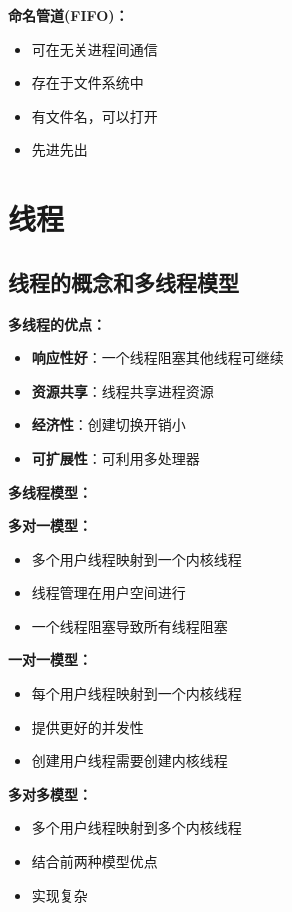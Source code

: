 \documentclass[lang=cn,newtx,10pt,scheme=chinese]{../../elegantbook}
\begin{document}
\textbf{命名管道(FIFO)：}
\begin{itemize}
  \item 可在无关进程间通信
  \item 存在于文件系统中
  \item 有文件名，可以打开
  \item 先进先出
\end{itemize}

\section{线程}

\subsection{线程的概念和多线程模型}

\textbf{多线程的优点：}
\begin{itemize}
  \item \textbf{响应性好}：一个线程阻塞其他线程可继续
  \item \textbf{资源共享}：线程共享进程资源
  \item \textbf{经济性}：创建切换开销小
  \item \textbf{可扩展性}：可利用多处理器
\end{itemize}

\textbf{多线程模型：}

\textbf{多对一模型：}
\begin{itemize}
  \item 多个用户线程映射到一个内核线程
  \item 线程管理在用户空间进行
  \item 一个线程阻塞导致所有线程阻塞
\end{itemize}

\textbf{一对一模型：}
\begin{itemize}
  \item 每个用户线程映射到一个内核线程
  \item 提供更好的并发性
  \item 创建用户线程需要创建内核线程
\end{itemize}

\textbf{多对多模型：}
\begin{itemize}
  \item 多个用户线程映射到多个内核线程
  \item 结合前两种模型优点
  \item 实现复杂
\end{itemize}
\end{document}
